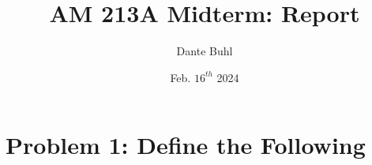 \documentclass{article}
\title{AM 213A Midterm: Report}
\author{Dante Buhl}
\date{Feb. $16^{th}$ 2024}
\begin{document}
\newcommand{\bs}[1]{\boldsymbol{#1}}
\newcommand{\bmp}[1]{\begin{minipage}{#1\textwidth}}
\newcommand{\emp}{\end{minipage}}
\newcommand{\R}{\mathbb{R}}
\newcommand{\C}{\mathbb{C}}
\newcommand{\N}{\mathcal{N}}
\newcommand{\I}{\mathrm{I}}
\newcommand{\K}{\bs{\mathrm{K}}}
\newcommand{\m}{\bs{\mu}_*}
\newcommand{\s}{\bs{\Sigma}_*}
\newcommand{\dt}{\Delta t}
\newcommand{\tr}[1]{\text{Tr}(#1)}
\newcommand{\Tr}[1]{\text{Tr}(#1)}
\newcommand{\Span}[1]{\text{span}(#1)}

\maketitle


\section{Problem 1: Define the Following}
\end{document}
